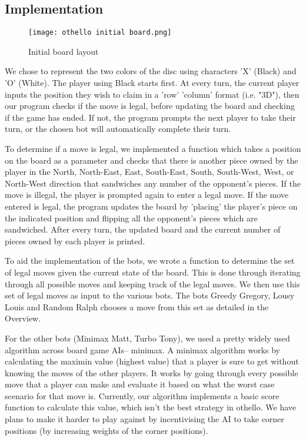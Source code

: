 \documentclass[a4paper,11pt]{article}
\begin{document}
\subsection{Implementation}

\begin{figure}[hpt]
    \centering
    \texttt{[image: othello initial board.png]}
    \caption{Initial board layout}
    \label{fig:initial othello board}
\end{figure}

We chose to represent the two colors of the disc using characters 'X' (Black) and 'O' (White). The player using Black starts first. At every turn, the current player inputs the position they wish to claim in a 'row' 'column' format (i.e. "3D"), then our program checks if the move is legal, before updating the board and checking if the game has ended. If not, the program prompts the next player to take their turn, or the chosen bot will automatically complete their turn. \newline

To determine if a move is legal, we implemented a function which takes a position on the board as a parameter and checks that there is another piece owned by the player in the North, North-East, East, South-East, South, South-West, West, or North-West direction that sandwiches any number of the opponent's pieces. If the move is illegal, the player is prompted again to enter a legal move. If the move entered is legal, the program updates the board by 'placing' the player's piece on the indicated position and flipping all the opponent's pieces which are sandwiched. After every turn, the updated board and the current number of pieces owned by each player is printed. \newline

To aid the implementation of the bots, we wrote a function to determine the set of legal moves given the current state of the board. This is done through iterating through all possible moves and keeping track of the legal moves. We then use this set of legal moves as input to the various bots. The bots Greedy Gregory, Lousy Louis and Random Ralph chooses a move from this set as detailed in the Overview. \newline

For the other bots (Minimax Matt, Turbo Tony), we used a pretty widely used algorithm across board game AIs-- minimax. A minimax algorithm works by calculating the maximin value (highest value) that a player is sure to get without knowing the moves of the other players. It works by going through every possible move that a player can make and evaluate it based on what the worst case scenario for that move is. Currently, our algorithm implements a basic score function to calculate this value, which isn't the best strategy in othello. We have plans to make it harder to play against by incentivising the AI to take corner positions (by increasing weights of the corner positions).
\end{document}
